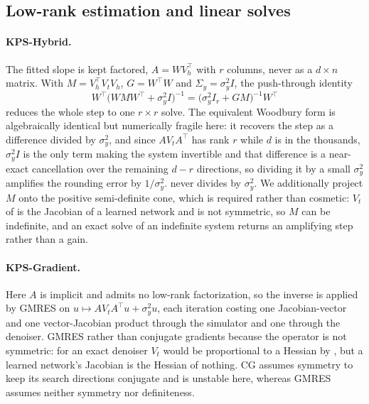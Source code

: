 \subsection{Low-rank estimation and linear solves} \label{appendice:lowrank}

\paragraph{KPS-Hybrid.} The fitted slope is kept factored, $A = W V_h^{\top}$ with $r$ columns,
never as a $d \times n$ matrix. With $M = V_h^{\top} V_t V_h$, $G = W^{\top}W$ and
$\Sigma_y = \sigma_y^{2}I$, the push-through identity
\begin{equation} \label{eq:pushthrough}
    W^{\top}\bigl(W M W^{\top} + \sigma_y^{2} I\bigr)^{-1}
    = \bigl(\sigma_y^{2} I_r + G M\bigr)^{-1} W^{\top}
\end{equation}
reduces the whole step to one $r \times r$ solve. The equivalent Woodbury form is algebraically
identical but numerically fragile here: it recovers the step as a difference divided by
$\sigma_y^{2}$, and since $AV_tA^{\top}$ has rank $r$ while $d$ is in the thousands,
$\sigma_y^{2}I$ is the only term making the system invertible and that difference is a near-exact
cancellation over the remaining $d - r$ directions, so dividing it by a small $\sigma_y^{2}$
amplifies the rounding error by $1/\sigma_y^{2}$.  never divides by
$\sigma_y^{2}$. We additionally project $M$ onto the positive semi-definite cone, which is
required rather than cosmetic: $V_t$ of  is the Jacobian of a learned network and is
not symmetric, so $M$ can be indefinite, and an exact solve of an indefinite system returns an
amplifying step rather than a gain.

\paragraph{KPS-Gradient.} Here $A$ is implicit and admits no low-rank factorization, so the
inverse is applied by GMRES \citep{GMRES} on $u \mapsto A V_t A^{\top} u + \sigma_y^{2} u$, each
iteration costing one Jacobian-vector and one vector-Jacobian product through the simulator and
one through the denoiser. GMRES rather than conjugate gradients because the operator is not
symmetric: for an exact denoiser $V_t$ would be proportional to a Hessian by , but a
learned network's Jacobian is the Hessian of nothing. CG assumes symmetry to keep its search
directions conjugate and is unstable here, whereas GMRES assumes neither symmetry nor
definiteness.

